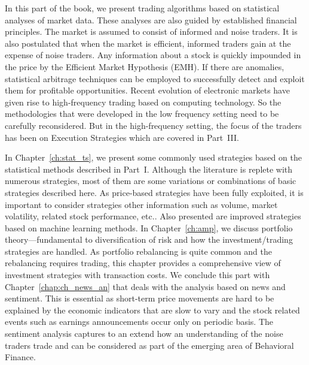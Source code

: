 
In this part of the book, we present trading algorithms based on statistical analyses of market data. These analyses are also guided by established financial principles. The market is assumed to consist of informed and noise traders. It is also postulated that when the market is efficient, informed traders gain at the expense of noise traders. Any information about a stock is quickly impounded in the price by the Efficient Market Hypothesis (EMH). If there are anomalies, statistical arbitrage techniques can be employed to successfully detect and exploit them for profitable opportunities. Recent evolution of electronic markets have given rise to high-frequency trading based on computing technology. So the methodologies that were developed in the low frequency setting need to be carefully reconsidered. But in the high-frequency setting, the focus of the traders has been on Execution Strategies which are covered in Part~III.


In Chapter~\ref{ch:stat_ts}, we present some commonly used strategies based on the statistical methods described in Part~I. Although the literature is replete with numerous strategies, most of them are some variations or combinations of basic strategies described here. As price-based strategies have been fully exploited, it is important to consider strategies other information such as volume, market volatility, related stock performance, etc.. Also presented are improved strategies based on machine learning methods. In Chapter~\ref{ch:amp}, we discuss portfolio theory---fundamental to diversification of risk and how the investment/trading strategies are handled. As portfolio rebalancing is quite common and the rebalancing requires trading, this chapter provides a comprehensive view of investment strategies with transaction costs. We conclude this part with Chapter~\ref{chap:ch_news_an} that deals with the analysis based on news and sentiment. This is essential as short-term price movements are hard to be explained by the economic indicators that are slow to vary and the stock related events such as earnings announcements occur only on periodic basis. The sentiment analysis captures to an extend how an understanding of the noise traders trade and can be considered as part of the emerging area of Behavioral Finance. 


